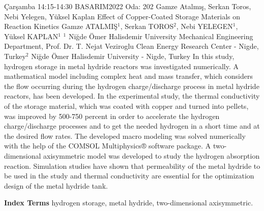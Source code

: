 
    \begin{abstract_basarim}
    {Çarşamba 14:15-14:30}
    {BASARIM2022}
    {Oda: 202}
    {Gamze Atalmış, Serkan Toros, Nebi Yelegen, Yüksel Kaplan}
    {Effect of Copper-Coated Storage Materials on Reaction Kinetics}
    {%
    Gamze ATALMIŞ$^{1}$, Serkan TOROS$^{2}$, Nebi YELEGEN$^{1}$, Yüksel KAPLAN$^{1}$}
    {%
    }
    {%
    $^1$ Niğde Ömer Halisdemir University Mechanical Engineering Department, Prof. Dr. T. Nejat Veziroglu Clean Energy Research Center - Nigde, Turkey\newline{}$^2$ Niğde Ömer Halisdemir University - Nigde, Turkey}
    In this study, hydrogen storage in metal hydride reactors was investigated numerically. A mathematical model including complex heat and mass transfer, which considers the flow occurring during the hydrogen charge/discharge process in metal hydride reactors, has been developed. In the experimental study, the thermal conductivity of the storage material, which was coated with copper and turned into pellets, was improved by 500-750 percent in order to accelerate the hydrogen charge/discharge processes and to get the needed hydrogen in a short time and at the desired flow rates. The developed macro modeling was solved numerically with the help of the COMSOL Multiphysics® software package. A two-dimensional axisymmetric model was developed to study the hydrogen absorption reaction. Simulation studies have shown that permeability of the metal hydride to be used in the study and thermal conductivity are essential for the optimization design of the metal hydride tank. 
    
            \textbf{Index Terms} \newline{}hydrogen storage, metal hydride, two-dimensional axisymmetric.
    \end{abstract_basarim}
    